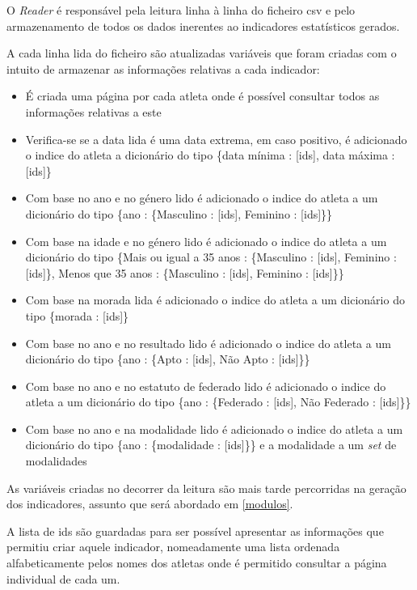 O \textit{Reader} é responsável pela leitura linha à linha do ficheiro
csv e pelo armazenamento de todos os dados inerentes ao indicadores estatísticos
gerados.

A cada linha lida do ficheiro são atualizadas variáveis que foram criadas com o intuito de
armazenar as informações relativas a cada indicador:
\begin{itemize}
    \item É criada uma página por cada atleta onde é possível consultar todos as 
    informações relativas a este
    \item Verifica-se se a data lida é uma data extrema, em caso positivo, é adicionado
    o indice do atleta a dicionário do tipo \{data mínima : [ids], data máxima : [ids]\}
    \item Com base no ano e no género lido é adicionado o indice do atleta
    a um dicionário do tipo \{ano : \{Masculino : [ids], Feminino : [ids]\}\}
    \item Com base na idade e no género lido é adicionado o indice do atleta
    a um dicionário do tipo \{Mais ou igual a 35 anos : \{Masculino : [ids], 
    Feminino : [ids]\}, Menos que 35 anos : \{Masculino : [ids], 
    Feminino : [ids]\}\}
    \item Com base na morada lida é adicionado o indice do atleta
    a um dicionário do tipo \{morada : [ids]\}
    \item Com base no ano e no resultado lido é adicionado o indice do atleta
    a um dicionário do tipo \{ano : \{Apto : [ids], Não Apto : [ids]\}\}
    \item Com base no ano e no estatuto de federado lido é adicionado o indice do atleta
    a um dicionário do tipo \{ano : \{Federado : [ids], Não Federado : [ids]\}\}
    \item Com base no ano e na modalidade lido é adicionado o indice do atleta
    a um dicionário do tipo \{ano : \{modalidade : [ids]\}\} e a modalidade a um 
    \textit{set} de modalidades
\end{itemize}

As variáveis criadas no decorrer da leitura são mais tarde percorridas na geração dos
indicadores, assunto que será abordado em \ref{modulos}.

A lista de ids são guardadas para ser possível apresentar as informações que permitiu
criar aquele indicador, nomeadamente uma lista ordenada alfabeticamente pelos nomes dos 
atletas onde é permitido consultar a página individual de cada um.
